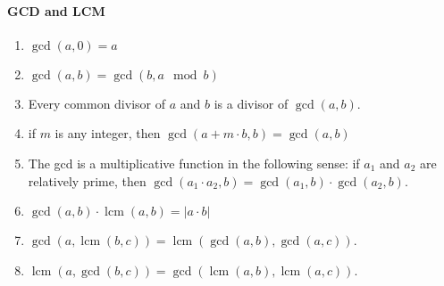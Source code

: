 \paragraph{GCD and LCM}\begin{enumerate}

            
            \item $\displaystyle \gcd(a, 0) = a$
            \item $\displaystyle \gcd(a, b) = \gcd(b, a \mod b)$
            \item Every common divisor of $\displaystyle a$ and $b$ is a divisor of $\displaystyle \gcd(a,b)$.
            \item if $m$ is any integer, then $\displaystyle \gcd(a + m {\cdot} b, b) = \gcd(a, b)$
            \item The gcd is a multiplicative function in the following sense: if $\displaystyle a_1$ and $\displaystyle
                a_2$
                are
                relatively prime, then $\displaystyle \gcd(a_1 \cdot a_2, b) = \gcd(a_1, b) \cdot \gcd(a_2,b )$.
            \item $\displaystyle \gcd(a, b){\cdot} \operatorname{lcm}(a, b) = |a{\cdot}b|$
            \item $\displaystyle \gcd(a, \operatorname{lcm}(b, c)) = \operatorname{lcm}(\gcd(a, b), \gcd(a, c))$.
            \item $\displaystyle \operatorname{lcm}(a, \gcd(b, c)) = \gcd(\operatorname{lcm}(a, b), \operatorname{lcm}(a,
                c))$.
            

\end{enumerate}
